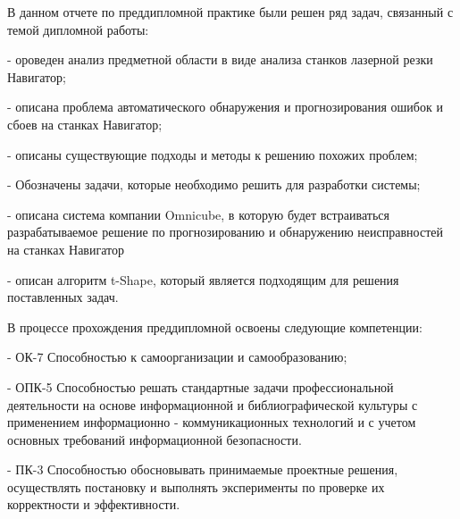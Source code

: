
В данном отчете по преддипломной практике
были решен ряд задач, связанный с темой дипломной работы:

- ороведен анализ предметной области в виде анализа станков лазерной резки Навигатор;

- описана проблема автоматического обнаружения и прогнозирования ошибок и сбоев
на станках Навигатор;

- описаны существующие подходы и методы к решению похожих проблем;

- Обозначены задачи, которые необходимо решить для разработки системы;

- описана система компании Omnicube, в которую будет встраиваться разрабатываемое решение
по прогнозированию и обнаружению неисправностей на станках Навигатор

- описан алгоритм t-Shape, который является подходящим для решения поставленных задач.


В процессе прохождения преддипломной освоены следующие компетенции:

- ОК-7 Способностью к самоорганизации и самообразованию;

- ОПК-5 Способностью решать стандартные задачи профессиональной деятельности на основе информационной и библиографической культуры с применением информационно - коммуникационных технологий и с учетом основных требований информационной безопасности.

- ПК-3 Способностью обосновывать принимаемые проектные решения, осуществлять постановку и выполнять эксперименты по проверке их корректности и эффективности.

\clearpage